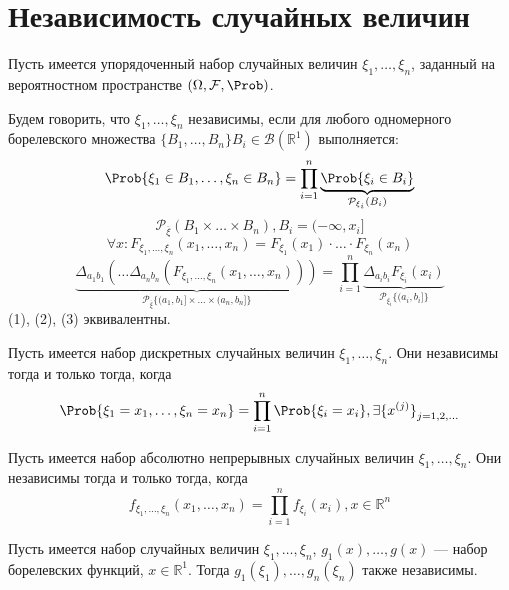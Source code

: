 \section{Независимость случайных величин}
Пусть имеется упорядоченный набор случайных величин $\xi_1, \ldots, \xi_n$, заданный на вероятностном пространстве $(\Omega, \mathcal{F}, \Prob)$.
\begin{definition}
	Будем говорить, что $\xi_1, \ldots, \xi_n$ независимы, если для любого одномерного борелевского множества $\{ B_1, \ldots, B_n \} B_i \in \mathcal{B}(\mathbb{R}^1)$ выполняется:
	\begin{equation}
		\Prob \{ \xi_1 \in B_1, \ldots, \xi_n \in B_n \} = \prod\limits_{i = 1}^n \underbrace{\Prob \{ \xi_i \in B_i \}}_{\mathcal{P}_{\xi_i}(B_i)}
	\end{equation}
	\[
		\mathcal{P}_{\overline{\xi}} (B_1 \times \ldots \times B_n), B_i = (-\infty, x_i]
	\]
	\begin{equation}
		\forall x: F_{\xi_1, \ldots, \xi_n} (x_1, \ldots, x_n) = F_{\xi_1} (x_1) \cdot \ldots \cdot F_{\xi_n} (x_n)
	\end{equation}
	\begin{equation}
		\underbrace{\Delta_{a_1 b_1} (\ldots \Delta_{a_n b_n} (F_{\xi_1, \ldots, \xi_n} (x_1, \ldots, x_n)))}_{\mathcal{P}_{ \overline{\xi}} \{ (a_1, b_1] \times \ldots \times (a_n, b_n] \} } =
		\prod\limits_{i = 1}^n \underbrace{ \Delta_{a_i b_i} F_{\xi_i} (x_i) }_{\mathcal{P}_{\xi_i} \{ (a_i, b_i] \}}
	\end{equation}
	(1), (2), (3) эквивалентны.
\end{definition}

\begin{theorem}
	Пусть имеется набор дискретных случайных величин $\xi_1, \ldots, \xi_n$. Они независимы тогда и только тогда, когда
	\[
		\Prob \{ \xi_1 = x_1, \ldots, \xi_n = x_n \} = \prod\limits_{i = 1}^n \Prob \{ \xi_i = x_i \}, \exists {\{ x^{(j)} \}}_{j = 1, 2, \ldots}
	\]
\end{theorem}

\begin{theorem}
	Пусть имеется набор абсолютно непрерывных случайных величин $\xi_1, \ldots, \xi_n$. Они независимы тогда и только тогда, когда
	\[
		f_{\xi_1, \ldots, \xi_n} (x_1, \ldots, x_n) = \prod\limits_{i = 1}^n f_{\xi_i} (x_i), x \in \mathbb{R}^n
	\]
\end{theorem}

\begin{addition}
	Пусть имеется набор случайных величин $\xi_1, \ldots, \xi_n$, $g_1 (x), \ldots, g(x)$ --- набор борелевских функций, $x \in \mathbb{R}^1$. Тогда $g_1(\xi_1), \ldots, g_n (\xi_n)$ также независимы.
\end{addition}

